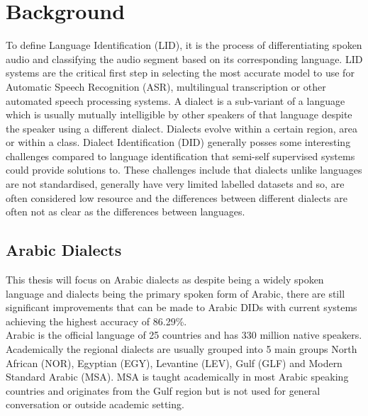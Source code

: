 \chapter{Background}\label{ch:background}
To define Language Identification (LID), it is the process of differentiating spoken audio and 
classifying the audio segment based on its corresponding language. 
LID systems are the critical first step in selecting the most accurate model to 
use for Automatic Speech Recognition (ASR), multilingual transcription or other automated speech processing systems. 
A dialect is a sub-variant of a language which is usually mutually intelligible by other speakers of that 
language despite the speaker using a different dialect. Dialects evolve within a certain region, area 
or within a class. Dialect Identification (DID) generally posses some interesting challenges compared to language 
identification that semi-self supervised systems could provide solutions to. These challenges include that 
dialects unlike languages are not standardised, generally have very limited labelled datasets and 
so, are often considered low resource and the differences between different dialects are often not as clear 
as the differences between languages. 


\section{Arabic Dialects}
This thesis will focus on Arabic dialects as despite being a widely spoken language and dialects 
being the primary spoken form of Arabic, there are still significant 
improvements that can be made to Arabic DIDs with current systems achieving the highest accuracy of 86.29\%. \\

Arabic is the official language of 25 countries and has 330 million native speakers.
\\Academically the regional dialects are usually grouped into 5 main groups North African (NOR), Egyptian (EGY), Levantine (LEV), Gulf (GLF) and Modern Standard Arabic (MSA). 
MSA is taught academically in most Arabic speaking countries and originates from the Gulf region but is not used 
for general conversation or outside academic setting.


